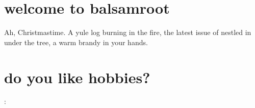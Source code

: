 \documentclass[10pt,a6paper,footinclude=false,firstfoot=false,headinclude=true,open=any,DIV=6]{scrbook} %
\begin{document}
\thispagestyle{empty}
\hbox{}
\newpage
{}

    \setcounter{page}{1}
    \thispagestyle{empty}
    \pagecolor{geraniumTitleColor}





    \begin{center}

    \noindent{}
    \end{center}

    \newpage
    \pagecolor{white}
    \restoregeometry
    \normalfont
    \normalsize
    \color{black}

    \setcounter{page}{2}

\chapter{welcome to balsamroot}

Ah, Christmastime. A yule log burning in the fire, the latest issue of  nestled in under the tree, a warm brandy in your hands.

\vspace{1ex}

\tableofcontents

\newpage
{}
\setcounter{page}{2}

\raggedbottom


\chapter{do you like hobbies?}

:


\vspace{2ex}
\titlerule
\end{document}
